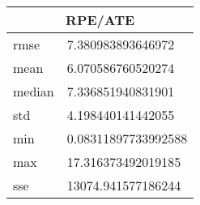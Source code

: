 \begin{table}[!ht] 
 \centering 
 \begin{tabular}{|l|l|} \hline 
 \multicolumn{2}{|c|}{RPE/ATE} \\ \hline 
 rmse & 7.380983893646972 \\ \hline 
mean & 6.070586760520274 \\ \hline 
median & 7.336851940831901 \\ \hline 
std & 4.198440141442055 \\ \hline 
min & 0.08311897733992588 \\ \hline 
max & 17.316373492019185 \\ \hline 
sse & 13074.941577186244 \\ \hline 
\end{tabular} 
 \end{table}